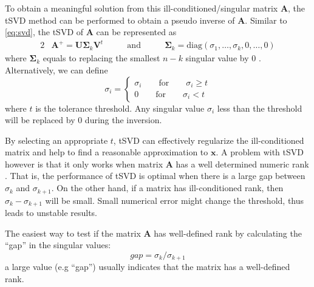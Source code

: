 			To obtain a meaningful solution from this ill-conditioned/singular matrix $\boldsymbol{A}$, the \gls{tSVD} method can be performed to obtain a pseudo inverse of $\boldsymbol{A}$.
			Similar to \cref{eq:svd}, the \gls{tSVD} of $\boldsymbol{A}$ can be represented as 
			\begin{alignat}{2}
				&\boldsymbol{A}^+ = \boldsymbol{U\Sigma}_k\boldsymbol{V}^t  &\qquad\text{and}\qquad  &\boldsymbol{\Sigma}_k=\mathrm{diag}(\sigma_1,\dots,\sigma_k,0,\dots,0)
				\label{eq:tsvd}				
			\end{alignat}
			where $\boldsymbol{\Sigma}_k$ equals to replacing the smallest $n-k$ singular value by 0 \citep{Hansen1987}. 
			Alternatively, we can define
			\begin{equation}
			\sigma_i=\begin{cases}
			\sigma_i\qquad\text{for}\qquad\sigma_i\ge t\\
			0\qquad\text{for}\qquad\sigma_i<t
			\end{cases}
			\end{equation}
			where $t$ is the tolerance threshold. 
			Any singular value $\sigma_i$ less than the threshold will be replaced by 0 during the inversion.
			
			By selecting an appropriate $t$, \gls{tSVD} can effectively regularize the ill-conditioned matrix and help to find a reasonable approximation to $\boldsymbol{x}$. 
			A problem with \gls{tSVD} however is that it only works when matrix $\boldsymbol{A}$ has a well determined numeric rank \citep{Hansen1987}.
			That is, the performance of \gls{tSVD} is optimal when there is a large gap between $\sigma_k$ and $\sigma_{k+1}$.
			On the other hand, if a matrix has ill-conditioned rank, then $\sigma_k-\sigma_{k+1}$ will be small.
			Small numerical error might change the threshold, thus leads to unstable results.
			 
			The easiest way to test if the matrix $\boldsymbol{A}$ has well-defined rank by calculating the ``gap'' in the singular values:
			\begin{equation}
			gap = \sigma_k/\sigma_{k+1}
			\label{eq:gapSingular}
			\end{equation}
			a large value (e.g ``gap'') usually indicates that the matrix has a well-defined rank.
			
